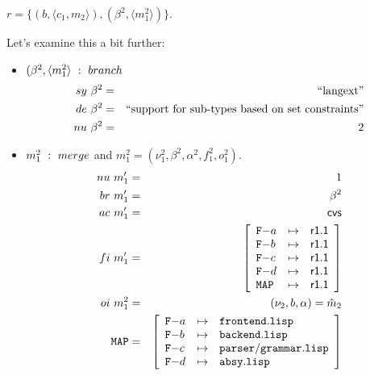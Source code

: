 \documentclass[fleqn, 10pt, a4paper]{report} \usepackage{amssymb}
\begin{document}
$r=\{(b, \langle c_1, m_2\rangle), (\beta^2, \langle m_1^2
\rangle)\}$.

Let's examine this a bit further:
\begin{itemize}
\item $(\beta^2, \langle m_1^2 \rangle\ :\ \mathnormal{branch}$
  \begin{eqnarray*}
    \mathnormal{sy}\ \beta^2 &=& \mbox{``langext''} \\
    \mathnormal{de}\ \beta^2 &=&
    \mbox{``support for sub-types based on set constraints''} \\
    \mathnormal{nu}\ \beta^2 &=& 2
  \end{eqnarray*}

\item $m_1^2\ :\ \mathnormal{merge}$ and $m_1^2=(\nu_1^2, \beta^2,
  \alpha^2, f_1^2, o_1^2)$.
  \begin{eqnarray*}
    \mathnormal{nu}\ m'_1 &=& 1 \\
    \mathnormal{br}\ m'_1 &=& \beta^2 \\
    \mathnormal{ac}\ m'_1 &=& \mathsf{cvs} \\
    \mathnormal{fi}\ m'_1 &=& \left[
      \begin{array}{lcl}
        \mathtt{F-}a & \mapsto & \mathsf{r1.1} \\
        \mathtt{F-}b & \mapsto & \mathsf{r1.1} \\
        \mathtt{F-}c & \mapsto & \mathsf{r1.1} \\
        \mathtt{F-}d & \mapsto & \mathsf{r1.1} \\
        \mathtt{MAP} & \mapsto & \mathsf{r1.1} \\
      \end{array}\right] \\
    \mathnormal{oi}\ m_1^2 &=& (\nu_2, b, \alpha) = \hat m_2 \\
    \mathtt{MAP} &=& \left[
      \begin{array}{lcl}
        \mathtt{F-}a &\mapsto& \mathtt{frontend.lisp} \\
        \mathtt{F-}b &\mapsto& \mathtt{backend.lisp} \\
        \mathtt{F-}c &\mapsto& \mathtt{parser/grammar.lisp} \\
        \mathtt{F-}d &\mapsto& \mathtt{absy.lisp} \\
      \end{array}\right]
  \end{eqnarray*}
\end{itemize}
\end{document}
